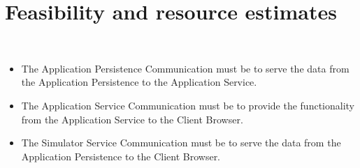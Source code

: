 \chapter{Feasibility and resource estimates}
\label{chap:feasresest}
 \\
\begin{itemize}
\item The Application Persistence Communication must be  to serve the data from the Application Persistence to the Application Service.
\item The Application Service Communication must be  to provide the functionality from the Application Service to the Client Browser.
\item The Simulator Service Communication must be  to serve the data from the Application Persistence to the Client Browser.
\end{itemize}


